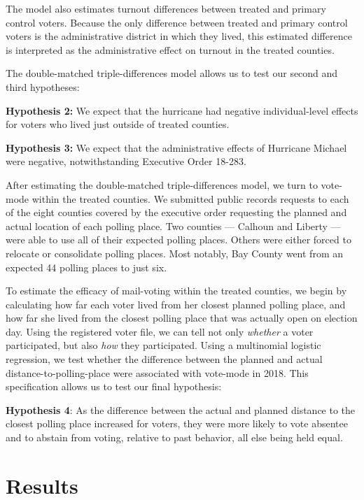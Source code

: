 \documentclass[
  12pt,
]{article}
\begin{document}
The model also estimates turnout differences between treated and primary control voters. Because the only difference between treated and primary control voters is the administrative district in which they lived, this estimated difference is interpreted as the administrative effect on turnout in the treated counties.

The double-matched triple-differences model allows us to test our second and third hypotheses:

\textbf{Hypothesis 2:} We expect that the hurricane had negative individual-level effects for voters who lived just outside of treated counties.

\textbf{Hypothesis 3:} We expect that the administrative effects of Hurricane Michael were negative, notwithstanding Executive Order 18-283.

After estimating the double-matched triple-differences model, we turn to vote-mode within the treated counties. We submitted public records requests to each of the eight counties covered by the executive order requesting the planned and actual location of each polling place. Two counties --- Calhoun and Liberty --- were able to use all of their expected polling places. Others were either forced to relocate or consolidate polling places. Most notably, Bay County went from an expected 44 polling places to just six.

To estimate the efficacy of mail-voting within the treated counties, we begin by calculating how far each voter lived from her closest planned polling place, and how far she lived from the closest polling place that was actually open on election day. Using the registered voter file, we can tell not only \emph{whether} a voter participated, but also \emph{how} they participated. Using a multinomial logistic regression, we test whether the difference between the planned and actual distance-to-polling-place were associated with vote-mode in 2018. This specification allows us to test our final hypothesis:

\textbf{Hypothesis 4}: As the difference between the actual and planned distance to the closest polling place increased for voters, they were more likely to vote absentee and to abstain from voting, relative to past behavior, all else being held equal.

\hypertarget{results}{%
\section*{Results}\label{results}}
\end{document}
